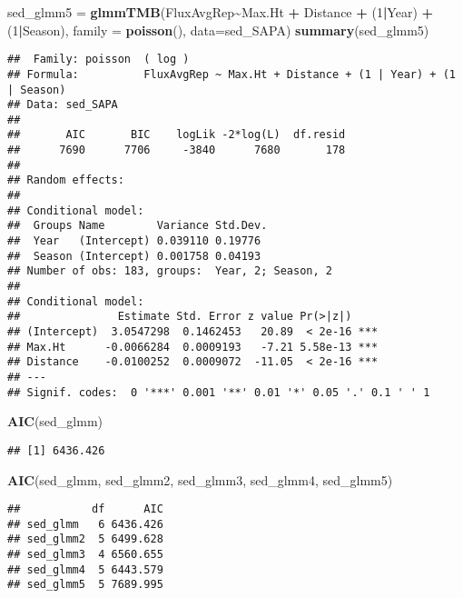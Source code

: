\documentclass[
]{article}
\newenvironment{Shaded}{\begin{snugshade}}{\end{snugshade}}
\newcommand{\AttributeTok}[1]{\textcolor[rgb]{0.13,0.29,0.53}{#1}}
\newcommand{\DecValTok}[1]{\textcolor[rgb]{0.00,0.00,0.81}{#1}}
\newcommand{\FunctionTok}[1]{\textcolor[rgb]{0.13,0.29,0.53}{\textbf{#1}}}
\newcommand{\NormalTok}[1]{#1}
\newcommand{\OtherTok}[1]{\textcolor[rgb]{0.56,0.35,0.01}{#1}}
\newcommand{\SpecialCharTok}[1]{\textcolor[rgb]{0.81,0.36,0.00}{\textbf{#1}}}
\begin{document}
\begin{Shaded}
\begin{Highlighting}[]
\NormalTok{sed\_glmm5 }\OtherTok{=} \FunctionTok{glmmTMB}\NormalTok{(FluxAvgRep}\SpecialCharTok{\textasciitilde{}}\NormalTok{Max.Ht }\SpecialCharTok{+}\NormalTok{ Distance }\SpecialCharTok{+}\NormalTok{ (}\DecValTok{1}\SpecialCharTok{|}\NormalTok{Year) }\SpecialCharTok{+}\NormalTok{ (}\DecValTok{1}\SpecialCharTok{|}\NormalTok{Season), }\AttributeTok{family =} \FunctionTok{poisson}\NormalTok{(), }\AttributeTok{data=}\NormalTok{sed\_SAPA)}
\FunctionTok{summary}\NormalTok{(sed\_glmm5)}
\end{Highlighting}
\end{Shaded}

\begin{verbatim}
##  Family: poisson  ( log )
## Formula:          FluxAvgRep ~ Max.Ht + Distance + (1 | Year) + (1 | Season)
## Data: sed_SAPA
## 
##       AIC       BIC    logLik -2*log(L)  df.resid 
##      7690      7706     -3840      7680       178 
## 
## Random effects:
## 
## Conditional model:
##  Groups Name        Variance Std.Dev.
##  Year   (Intercept) 0.039110 0.19776 
##  Season (Intercept) 0.001758 0.04193 
## Number of obs: 183, groups:  Year, 2; Season, 2
## 
## Conditional model:
##               Estimate Std. Error z value Pr(>|z|)    
## (Intercept)  3.0547298  0.1462453   20.89  < 2e-16 ***
## Max.Ht      -0.0066284  0.0009193   -7.21 5.58e-13 ***
## Distance    -0.0100252  0.0009072  -11.05  < 2e-16 ***
## ---
## Signif. codes:  0 '***' 0.001 '**' 0.01 '*' 0.05 '.' 0.1 ' ' 1
\end{verbatim}

\begin{Shaded}
\begin{Highlighting}[]
\FunctionTok{AIC}\NormalTok{(sed\_glmm)}
\end{Highlighting}
\end{Shaded}

\begin{verbatim}
## [1] 6436.426
\end{verbatim}

\begin{Shaded}
\begin{Highlighting}[]
\FunctionTok{AIC}\NormalTok{(sed\_glmm, sed\_glmm2, sed\_glmm3, sed\_glmm4, sed\_glmm5)}
\end{Highlighting}
\end{Shaded}

\begin{verbatim}
##           df      AIC
## sed_glmm   6 6436.426
## sed_glmm2  5 6499.628
## sed_glmm3  4 6560.655
## sed_glmm4  5 6443.579
## sed_glmm5  5 7689.995
\end{verbatim}
\end{document}
